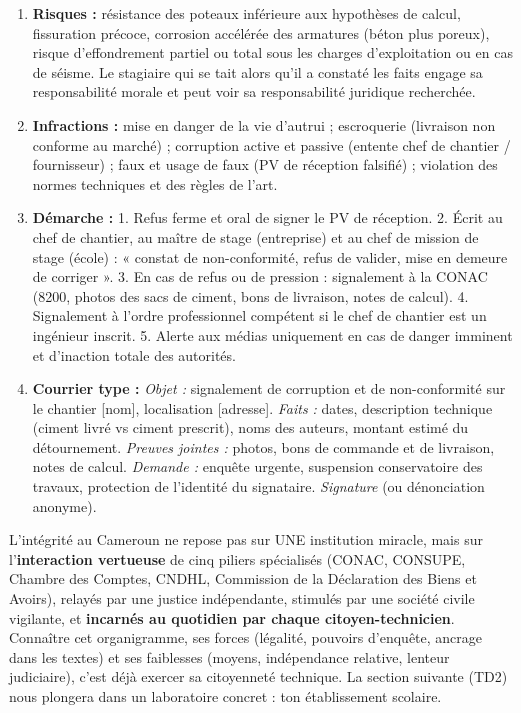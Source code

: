 \documentclass[11pt]{article}
\begin{document}
\begin{corrige}
\begin{enumerate}
\item \textbf{Risques :} résistance des poteaux inférieure aux hypothèses de calcul, fissuration précoce, corrosion accélérée des armatures (béton plus poreux), risque d'effondrement partiel ou total sous les charges d'exploitation ou en cas de séisme. Le stagiaire qui se tait alors qu'il a constaté les faits engage sa responsabilité morale et peut voir sa responsabilité juridique recherchée.
\item \textbf{Infractions :} mise en danger de la vie d'autrui ; escroquerie (livraison non conforme au marché) ; corruption active et passive (entente chef de chantier / fournisseur) ; faux et usage de faux (PV de réception falsifié) ; violation des normes techniques et des règles de l'art.
\item \textbf{Démarche :} 1. Refus ferme et oral de signer le PV de réception. 2. Écrit au chef de chantier, au maître de stage (entreprise) et au chef de mission de stage (école) : « constat de non-conformité, refus de valider, mise en demeure de corriger ». 3. En cas de refus ou de pression : signalement à la CONAC (8200, photos des sacs de ciment, bons de livraison, notes de calcul). 4. Signalement à l'ordre professionnel compétent si le chef de chantier est un ingénieur inscrit. 5. Alerte aux médias uniquement en cas de danger imminent et d'inaction totale des autorités.
\item \textbf{Courrier type :} \emph{Objet :} signalement de corruption et de non-conformité sur le chantier [nom], localisation [adresse]. \emph{Faits :} dates, description technique (ciment livré vs ciment prescrit), noms des auteurs, montant estimé du détournement. \emph{Preuves jointes :} photos, bons de commande et de livraison, notes de calcul. \emph{Demande :} enquête urgente, suspension conservatoire des travaux, protection de l'identité du signataire. \emph{Signature} (ou dénonciation anonyme).
\end{enumerate}
\end{corrige}

\begin{aretenir}
L'intégrité au Cameroun ne repose pas sur UNE institution miracle, mais sur l'\textbf{interaction vertueuse} de cinq piliers spécialisés (CONAC, CONSUPE, Chambre des Comptes, CNDHL, Commission de la Déclaration des Biens et Avoirs), relayés par une justice indépendante, stimulés par une société civile vigilante, et \textbf{incarnés au quotidien par chaque citoyen-technicien}. Connaître cet organigramme, ses forces (légalité, pouvoirs d'enquête, ancrage dans les textes) et ses faiblesses (moyens, indépendance relative, lenteur judiciaire), c'est déjà exercer sa citoyenneté technique. La section suivante (TD2) nous plongera dans un laboratoire concret : ton établissement scolaire.
\end{aretenir}
\end{document}
